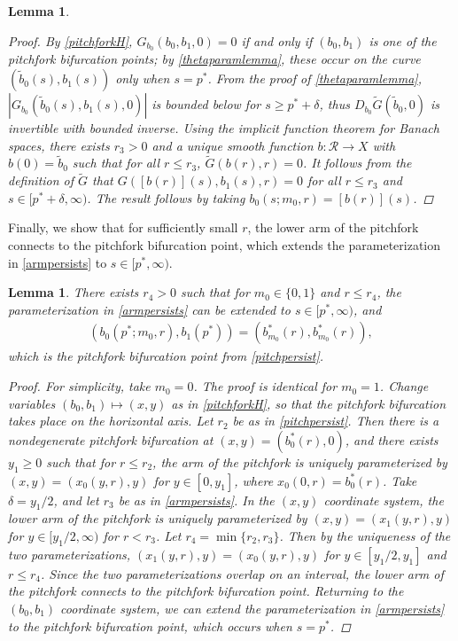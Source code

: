 \documentclass[12pt]{elsarticle}
\theoremstyle{plain}
\newtheorem{lemma}[theorem]{Lemma}
\theoremstyle{definition}
\theoremstyle{remark}
\numberwithin{theorem}{section}
\numberwithin{equation}{section}
\begin{document}
\begin{lemma}
\begin{proof}
By \cref{pitchforkH}, $G_{b_0}(b_0, b_1, 0) = 0$ if and only if $(b_0, b_1)$ is one of the pitchfork bifurcation points; by \cref{thetaparamlemma}, these occur on the curve $(\tilde{b}_0(s), b_1(s))$ only when $s = p^*$. From the proof of \cref{thetaparamlemma}, $|G_{b_0}(\tilde{b}_0(s), b_1(s), 0)|$ is bounded below for $s \geq p^* + \delta$, thus $D_{b_0} \tilde{G}(\tilde{b}_0, 0)$ is invertible with bounded inverse. Using the implicit function theorem for Banach spaces, there exists $r_3 > 0$ and a unique smooth function $b: \mathcal{R} \rightarrow X$ with $b(0) = \tilde{b}_0$ such that for all $r \leq r_3$, $\tilde{G}(b(r), r) = 0$. It follows from the definition of $\tilde{G}$ that $G([b(r)](s), b_1(s), r) = 0$ for all $r \leq r_3$ and $s \in [p^* + \delta, \infty)$. The result follows by taking $b_0(s; m_0, r) = [b(r)](s)$.
\end{proof}
\end{lemma} 

Finally, we show that for sufficiently small $r$, the lower arm of the pitchfork connects to the pitchfork bifurcation point, which extends the parameterization in \cref{armpersists} to $s \in [p^*, \infty)$.

\begin{lemma}\label{pitchforkconnects}
There exists $r_4 > 0$ such that for $m_0 \in \{0, 1\}$ and $r \leq r_4$, the parameterization in \cref{armpersists} can be extended to $s \in [p^*, \infty)$, and 
\begin{align*}
(b_0(p^*; m_0, r), b_1(p^*)) = (b_{m_0}^*(r), b_{m_0}^*(r)),
\end{align*}
which is the pitchfork bifurcation point from \cref{pitchpersist}.

\begin{proof}
For simplicity, take $m_0 = 0$. The proof is identical for $m_0 = 1$. Change variables $(b_0, b_1) \mapsto (x, y)$ as in \cref{pitchforkH}, so that the pitchfork bifurcation takes place on the horizontal axis. Let $r_2$ be as in \cref{pitchpersist}. Then there is a nondegenerate pitchfork bifurcation at $(x, y) = (b_0^*(r), 0)$, and there exists $y_1 \geq 0$ such that for $r \leq r_2$, the arm of the pitchfork is uniquely parameterized by $(x, y) = (x_0(y, r), y)$ for $y \in [0, y_1]$, where $x_0(0, r) = b_0^*(r)$. Take $\delta = y_1/2$, and let $r_3$ be as in \cref{armpersists}. In the $(x, y)$ coordinate system, the lower arm of the pitchfork is uniquely parameterized by 
$(x, y) = (x_1(y, r), y)$ for  $y \in [y_1/2, \infty)$ for $r < r_3$. Let $r_4 = \min\{ r_2, r_3 \}$. Then by the uniqueness of the two parameterizations, $(x_1(y, r), y) = (x_0(y, r), y)$ for $y \in [y_1/2, y_1]$ and $r \leq r_4$. Since the two parameterizations overlap on an interval, the lower arm of the pitchfork connects to the pitchfork bifurcation point. Returning to the $(b_0, b_1)$ coordinate system, we can extend the parameterization in \cref{armpersists} to the pitchfork bifurcation point, which occurs when $s = p^*$.
\end{proof}
\end{lemma}
\end{document}
